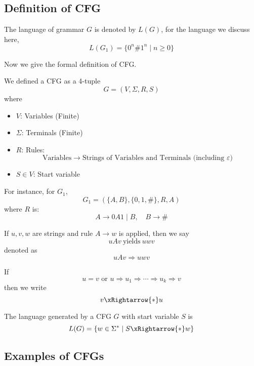 \newpage

\subsection{Definition of CFG}
The language of grammar $G$ is denoted by $L(G)$, for the language we discuss here,
\[
L(G_1) = \{ 0^n \# 1^n \mid n \geq 0 \}
\]

Now we give the formal definition of CFG.
\begin{definition}
    We defined a CFG as a 4-tuple 
    \[
        G = (V, \Sigma, R, S)
    \]
    where
    \begin{itemize}
        \item $V$: Variables (Finite)
        \item $\Sigma$: Terminals (Finite)
        \item $R$: Rules:
        \[
            \text{Variables} \to \text{Strings of Variables and Terminals (including $\varepsilon$)}
        \]
        \item $S \in V$: Start variable
    \end{itemize}
\end{definition}

For instance, for $G_1$,
\[
G_1 = (\{A, B\}, \{0, 1, \#\}, R, A)
\]
where $R$ is:
\[
    A \to 0A1 \mid B, \quad B \to \#
\]

\begin{notation}
    If $u, v, w$ are strings and rule $A \to w$ is applied, then we say
    \[
    uAv \ \text{yields}\ uwv
    \]
    denoted as
    \[
    uAv \Rightarrow uwv
    \]
\end{notation}

\begin{notation}
    If \[
    u = v \text{ or } u \Rightarrow u_1 \Rightarrow \cdots \Rightarrow u_k \Rightarrow v
    \] then we write
    \[
    v \xRightarrow{*} u
    \]
\end{notation}

\begin{definition}
    The language generated by a CFG $G$ with start variable $S$ is
    \[
    L(G) = \{ w \in \Sigma^* \mid S \xRightarrow{*} w \}
    \]
\end{definition}

\newpage

\subsection{Examples of CFGs}

